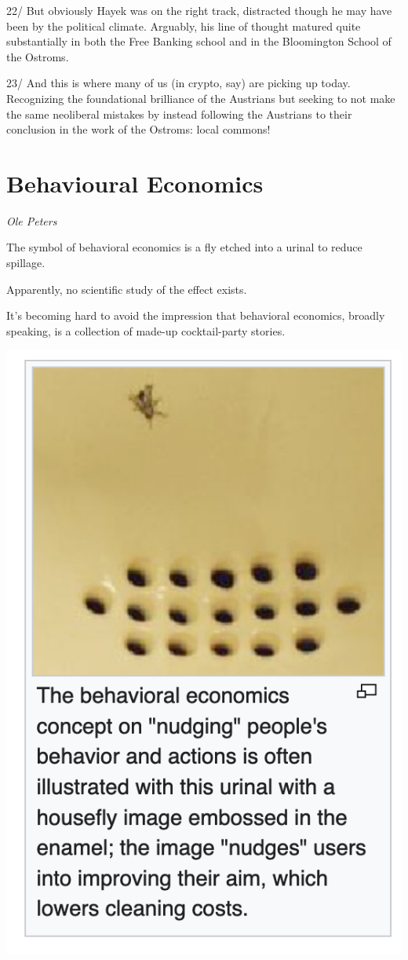 \documentclass[
]{book}
\begin{document}
22/ But obviously Hayek was on the right track, distracted though he may have been by the political climate. Arguably, his line of thought matured quite substantially in both the Free Banking school and in the Bloomington School of the Ostroms.

23/ And this is where many of us (in crypto, say) are picking up today. Recognizing the foundational brilliance of the Austrians but seeking to not make the same neoliberal mistakes by instead following the Austrians to their conclusion in the work of the Ostroms: local commons!

\hypertarget{behavioural-economics}{%
\chapter{Behavioural Economics}\label{behavioural-economics}}

\emph{Ole Peters}

The symbol of behavioral economics is a fly etched into a urinal to reduce spillage.

Apparently, no scientific study of the effect exists.

It's becoming hard to avoid the impression that behavioral economics, broadly speaking, is a collection of made-up cocktail-party stories.

\includegraphics{fig/behavioural_urinal.png}
\end{document}
